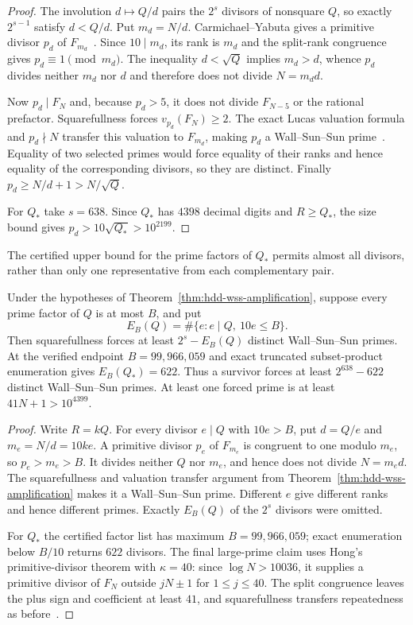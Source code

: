 \begin{proof}
The involution $d\mapsto Q/d$ pairs the $2^s$ divisors of nonsquare $Q$, so
exactly $2^{s-1}$ satisfy $d<Q/d$.  Put $m_d=N/d$.  Carmichael--Yabuta gives
a primitive divisor $p_d$ of $F_{m_d}$~\cite{Yabuta2001}.  Since
$10\mid m_d$, its rank is
$m_d$ and the split-rank congruence gives $p_d\equiv1\pmod{m_d}$.  The
inequality $d<\sqrt Q$ implies $m_d>d$, whence $p_d$ divides neither $m_d$
nor $d$ and therefore does not divide $N=m_dd$.

Now $p_d\mid F_N$ and, because $p_d>5$, it does not divide $F_{N-5}$ or the
rational prefactor.  Squarefullness forces $v_{p_d}(F_N)\geq2$.  The exact
Lucas valuation formula and $p_d\nmid N$ transfer this valuation to
$F_{m_d}$, making $p_d$ a Wall--Sun--Sun prime~\cite{Sanna2016}.  Equality of two selected
primes would force equality of their ranks and hence equality of the
corresponding divisors, so they are distinct.  Finally
$p_d\geq N/d+1>N/\sqrt Q$.

For $Q_*$ take $s=638$.  Since $Q_*$ has $4398$ decimal digits and
$R\geq Q_*$, the size bound gives
$p_d>10\sqrt{Q_*}>10^{2199}$.
\end{proof}

The certified upper bound for the prime factors of $Q_*$ permits almost all
divisors, rather than only one representative from each complementary pair.

\begin{theorem}
\label{thm:hdd-wss-factor-bound}
Under the hypotheses of
Theorem~\ref{thm:hdd-wss-amplification}, suppose every prime factor of $Q$
is at most $B$, and put
\[
 E_B(Q)=\#\{e:e\mid Q,\ 10e\leq B\}.
\]
Then squarefullness forces at least $2^s-E_B(Q)$ distinct Wall--Sun--Sun
primes.  At the verified endpoint $B=99{,}966{,}059$ and exact truncated
subset-product enumeration gives $E_B(Q_*)=622$.  Thus a survivor forces at
least $2^{638}-622$ distinct Wall--Sun--Sun primes.  At least one forced
prime is at least $41N+1>10^{4399}$.
\end{theorem}

\begin{proof}
Write $R=kQ$.  For every divisor $e\mid Q$ with $10e>B$, put
$d=Q/e$ and $m_e=N/d=10ke$.  A primitive divisor $p_e$ of $F_{m_e}$ is
congruent to one modulo $m_e$, so $p_e>m_e>B$.  It divides neither $Q$ nor
$m_e$, and hence does not divide $N=m_ed$.  The squarefullness and valuation
transfer argument from Theorem~\ref{thm:hdd-wss-amplification} makes it a
Wall--Sun--Sun prime.  Different $e$ give different ranks and hence different
primes.  Exactly $E_B(Q)$ of the $2^s$ divisors were omitted.

For $Q_*$ the certified factor list has maximum $B=99{,}966{,}059$; exact
enumeration below $B/10$ returns $622$ divisors.  The final large-prime claim
uses Hong's primitive-divisor theorem with $\kappa=40$: since
$\log N>10036$, it supplies a primitive divisor of $F_N$ outside
$jN\mathbin\pm1$ for $1\leq j\leq40$.  The split congruence leaves the plus
sign and coefficient at least $41$, and squarefullness transfers repeatedness
as before~\cite{Hong2025}.
\end{proof}

